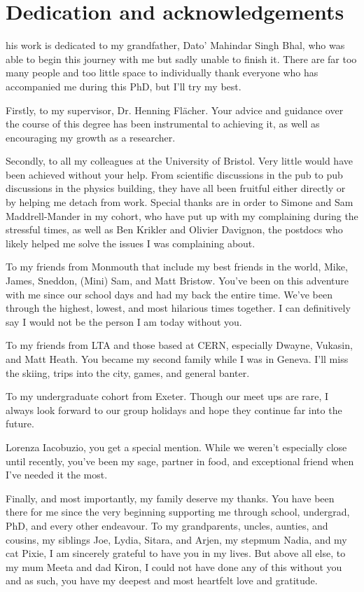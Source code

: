 %
%

\chapter*{Dedication and acknowledgements}
\begin{SingleSpace}
his work is dedicated to my grandfather, Dato' Mahindar Singh Bhal, who was able to begin this journey with me but sadly unable to finish it. There are far too many people and too little space to individually thank everyone who has accompanied me during this PhD, but I'll try my best.

Firstly, to my supervisor, Dr. Henning Fl\"{a}cher. Your advice and guidance over the course of this degree has been instrumental to achieving it, as well as encouraging my growth as a researcher.

Secondly, to all my colleagues at the University of Bristol. Very little would have been achieved without your help. From scientific discussions in the pub to pub discussions in the physics building, they have all been fruitful either directly or by helping me detach from work. Special thanks are in order to Simone and Sam Maddrell-Mander in my cohort, who have put up with my complaining during the stressful times, as well as Ben Krikler and Olivier Davignon, the postdocs who likely helped me solve the issues I was complaining about.

To my friends from Monmouth that include my best friends in the world, Mike, James, Sneddon, (Mini) Sam, and Matt Bristow. You've been on this adventure with me since our school days and had my back the entire time. We've been through the highest, lowest, and most hilarious times together. I can definitively say I would not be the person I am today without you.

To my friends from LTA and those based at CERN, especially Dwayne, Vukasin, and Matt Heath. You became my second family while I was in Geneva. I'll miss the skiing, trips into the city, games, and general banter.

To my undergraduate cohort from Exeter. Though our meet ups are rare, I always look forward to our group holidays and hope they continue far into the future.

Lorenza Iacobuzio, you get a special mention. While we weren't especially close until recently, you've been my sage, partner in food, and exceptional friend when I've needed it the most.

Finally, and most importantly, my family deserve my thanks. You have been there for me since the very beginning supporting me through school, undergrad, PhD, and every other endeavour. To my grandparents, uncles, aunties, and cousins, my siblings Joe, Lydia, Sitara, and Arjen, my stepmum Nadia, and my cat Pixie, I am sincerely grateful to have you in my lives. But above all else, to my mum Meeta and dad Kiron, I could not have done any of this without you and as such, you have my deepest and most heartfelt love and gratitude.

\end{SingleSpace}
\clearpage
